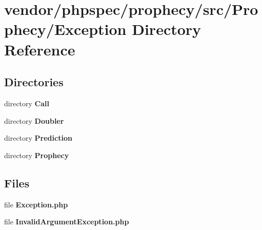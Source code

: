 \section{vendor/phpspec/prophecy/src/\+Prophecy/\+Exception Directory Reference}
\label{dir_7905c2bed82d931dbc772d4f308b7b88}
\subsection*{Directories}
\begin{DoxyCompactItemize}
\item 
directory {\bf Call}
\item 
directory {\bf Doubler}
\item 
directory {\bf Prediction}
\item 
directory {\bf Prophecy}
\end{DoxyCompactItemize}
\subsection*{Files}
\begin{DoxyCompactItemize}
\item 
file {\bf Exception.\+php}
\item 
file {\bf Invalid\+Argument\+Exception.\+php}
\end{DoxyCompactItemize}
